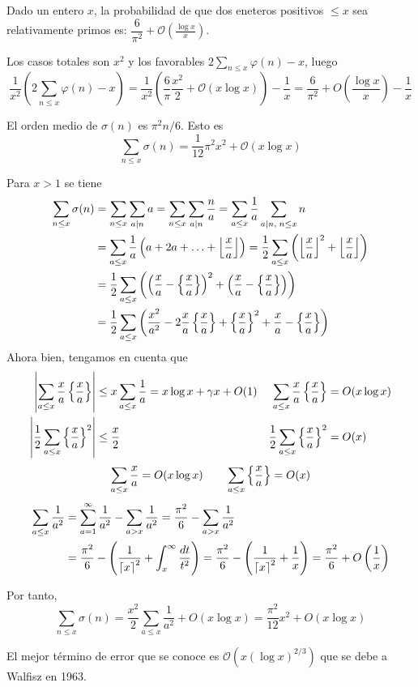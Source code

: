 \documentclass[TAN.tex]{subfiles}
\begin{document}
\begin{coro} Dado un entero $x$, la probabilidad de que dos eneteros positivos $≤x$ sea relativamente primos es: $\dfrac{6}{π^2}+ \mathcal{O}\left(\frac{\log x}{x}\right)$.
\end{coro}
\begin{dem}
Los casos totales son $x^2$ y los favorables $2\sum_{n\leq x} \varphi(n) -x$, luego
$$
\frac{1}{x^2}\left(2\sum_{n\leq x} \varphi(n) -x\right) =\frac{1}{x^2}\left( \frac{6}{π}\frac{x^2}{2} + \mathcal{O}(x\log x)\right) - \frac{1}{x} = \frac{6}{\pi^2} + O\left(\frac{\log x}{x}\right)-\frac{1}{x}
$$
\end{dem}
\begin{prop}
El orden medio de $σ(n)$ es $π^2n/6$. Esto es
\[ \sum_{n≤x} σ(n) = \frac{1}{12} π^2x^2 + \mathcal{O}(x\log x) \]
\end{prop}
\begin{dem}
Para $x>1$ se tiene
\begin{align*}
\sum_{n\leq x} \sigma(n)&=\sum_{n\leq x}\sum_{a\mid n} a = \sum_{n\leq x}\sum_{a\mid n} \frac{n}{a} = \sum_{a\leq x} \frac{1}{a}\sum_{a\mid n,\; n\leq x} n \\
&= \sum_{a\leq x}\frac{1}{a}\left(a+2a+\dotsc+\left\lfloor{\frac{x}{a}}\right\rfloor\right) =\frac{1}{2}\sum_{a\leq x}\left(\left\lfloor{\frac{x}{a}}\right\rfloor^2+\left\lfloor{\frac{x}{a}}\right\rfloor\right)\\
&=\frac{1}{2}\sum_{a\leq x}\left(\left(\frac{x}{a} - \left\{{\frac{x}{a}}\right\}\right)^2+\left(\frac{x}{a} - \left\{{\frac{x}{a}}\right\}\right)\right)\\
&=\frac{1}{2}\sum_{a\leq x}\left(\frac{x^2}{a^2} - 2\frac{x}{a}\left\{{\frac{x}{a}}\right\} +\left\{{\frac{x}{a}}\right\}^2 +\frac{x}{a}-\left\{{\frac{x}{a}}\right\}\right)
\end{align*}
Ahora bien, tengamos en cuenta que
\begin{align*}
\left|\sum_{a\leq x}\frac{x}{a}\left\{{\frac{x}{a}}\right\}\right|&\leq x\sum_{a\leq x}\frac{1}{a} = x\log x + \gamma x + O(1)  &
\sum_{a\leq x}\frac{x}{a}\left\{{\frac{x}{a}}\right\} &= O(x\log x)\\
\left|\frac{1}{2}\sum_{a\leq x}\left\{{\frac{x}{a}}\right\}^2\right|&\leq\frac{x}{2} & \frac{1}{2}\sum_{a\leq x}\left\{{\frac{x}{a}}\right\}^2 &= O(x)
\end{align*}
$$
\sum_{a\leq x}\frac{x}{a} = O(x\log x) \qquad
\sum_{a\leq x}\left\{{\frac{x}{a}}\right\} = O(x)
$$
\begin{align*}
\sum_{a\leq x}\frac{1}{a^2}& =\sum_{a=1}^\infty \frac{1}{a^2}- \sum_{a> x}\frac{1}{a^2} = \frac{\pi^2}{6}- \sum_{a> x}\frac{1}{a^2} \\
&=\frac{\pi^2}{6}- \left(\frac{1}{\left\lceil{x}\right\rceil^2}+\int_x^\infty \frac{dt}{t^2}\right) = \frac{\pi^2}{6}-\left(\frac{1}{\left\lceil{x}\right\rceil^2}+\frac{1}{x}\right) = \frac{\pi^2}{6} + O\left(\frac{1}{x}\right)
\end{align*}

Por tanto,
$$
\sum_{n\leq x} \sigma(n) = \frac{x^2}{2}\sum_{a\leq x}\frac{1}{a^2}+O(x\log x) = \frac{\pi^2}{12}x^2+O(x\log x )
$$
\end{dem}
El mejor término de error que se conoce es $\mathcal{O}(x(\log x)^{2/3})$ que se debe a Walfisz en 1963.
\end{document}

